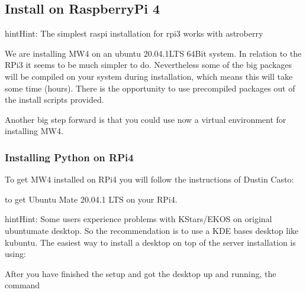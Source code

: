 \documentclass[a4paper,10pt,english]{sphinxmanual}
\begin{document}

\sphinxstepscope


\subsection{Install on RaspberryPi 4}
\label{\detokenize{install/rpi4:install-on-raspberrypi-4}}\label{\detokenize{install/rpi4::doc}}
\begin{sphinxadmonition}{hint}{Hint:}
\sphinxAtStartPar
The simplest raspi installation for rpi3 works with astroberry
\end{sphinxadmonition}

\sphinxAtStartPar
We are installing MW4 on an ubuntu 20.04.1LTS 64Bit system. In relation to the
RPi3 it seems to be much simpler to do. Nevertheless some of the big packages will
be compiled on your system during installation, which means this will take some
time (hours). There is the opportunity to use precompiled packages out of the
install scripts provided.

\sphinxAtStartPar
Another big step forward is that you could use now a virtual environment for
installing MW4.


\subsubsection{Installing Python on RPi4}
\label{\detokenize{install/rpi4:installing-python-on-rpi4}}
\sphinxAtStartPar
To get MW4 installed on RPi4 you will follow the instructions of Dustin Casto:

\sphinxAtStartPar
{}

\sphinxAtStartPar
to get Ubuntu Mate 20.04.1 LTS on your RPi4.

\begin{sphinxadmonition}{hint}{Hint:}
\sphinxAtStartPar
Some users experience problems with KStars/EKOS on original ubuntu\sphinxhyphen{}mate
desktop. So the recommendation is to use a KDE bases desktop like kubuntu. The
easiest way to install a desktop on top of the server installation is using:
\end{sphinxadmonition}

\sphinxAtStartPar
After you have finished the setup and got the desktop up and running, the command
\end{document}

